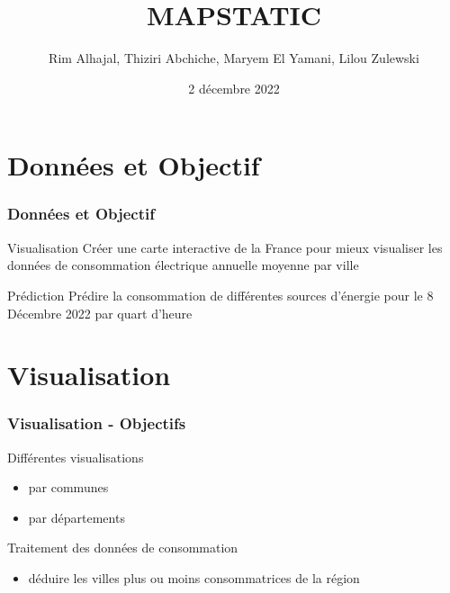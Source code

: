 \documentclass{beamer}
\title[Développement Logiciel]{MAPSTATIC}
\author[]{Rim Alhajal, Thiziri Abchiche, Maryem El Yamani, Lilou Zulewski}
\institute{M1 - SSD}
\date{2 décembre 2022}
\begin{document}
\maketitle

\section{Données et Objectif}






\begin{frame}
\frametitle{Données et Objectif}
\begin{block}{Visualisation}
Créer une carte interactive de la France pour mieux visualiser les données de consommation électrique annuelle moyenne par ville
\end{block}
\begin{block}{Prédiction}
Prédire la consommation de différentes sources d'énergie pour le 8 Décembre 2022 par quart d'heure
\end{block}
\end{frame}

\section{Visualisation}
\begin{frame}
\frametitle{Visualisation - Objectifs}
\begin{block}{Différentes visualisations}
\begin{itemize}
    \item par communes \\
    \item par départements \\
\end{itemize}
\end{block}
\begin{block}{Traitement des données de consommation}
\begin{itemize}
    \item déduire les villes plus ou moins consommatrices de la région
\end{itemize}
\end{block}
\end{frame}
\end{document}
